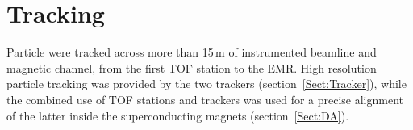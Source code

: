 \section{Tracking}{
\label{Sect:Tracking}

Particle were tracked across more than 15\,m of instrumented beamline and magnetic channel, from the first TOF station to the EMR.
High resolution particle tracking was provided by the two trackers (section~\ref{Sect:Tracker}), while the combined use of TOF stations and trackers was used for a precise alignment of the latter inside the superconducting magnets (section~\ref{Sect:DA}).

  \let\section\subsection
  \let\subsection\subsubsection
  \let\subsubsection\paragraph

}
